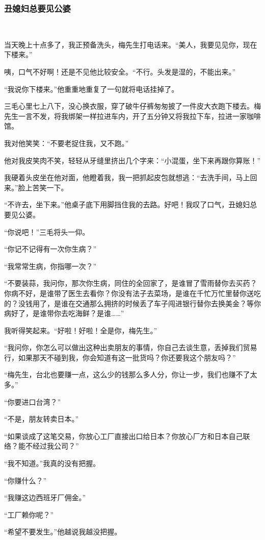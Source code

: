 \subsubsection*{丑媳妇总要见公婆} 
\par 当天晚上十点多了，我正预备洗头，梅先生打电话来。“美人，我要见见你，现在下楼来。”
\par 咦，口气不好啊！还是不见他比较安全。“不行。头发是湿的，不能出来。”
\par “我说你下楼来。”他重重地重复了一句就将电话挂掉了。
\par 三毛心里七上八下，没心换衣服，穿了破牛仔裤匆匆披了一件皮大衣跑下楼去。梅先生一言不发，将我绑架一样拉进车内，开了五分钟又将我拉下车，拉进一家咖啡馆。
\par 我对他笑笑：“不要老捉住我，又不跑。”
\par 他对我皮笑肉不笑，轻轻从牙缝里挤出几个字来：“小混蛋，坐下来再跟你算账！”
\par 我硬着头皮坐在他对面，他瞪着我，我一把抓起皮包就想逃：“去洗手间，马上回来。”脸上苦笑一下。
\par “不许去，坐下来。”他桌子底下用脚挡住我的去路。好吧！我叹了口气，丑媳妇总要见公婆。
\par “你说吧！”三毛将头一仰。
\par “你记不记得有一次你生病？”
\par “我常常生病，你指哪一次？”
\par “不要装蒜，我问你，那次你生病，同住的全回家了，是谁冒了雪雨替你去买药？你病不好，是谁带了医生去看你？你没有法子去菜场，是谁在千忙万忙里替你送吃的？没钱用了，是谁在交通那么拥挤的时候丢了车子闯进银行替你去换美金？等你病好了，是谁带你去吃海鲜？是谁……”
\par 我听得笑起来。“好啦！好啦！全是你，梅先生。”
\par “我问你，你怎么可以做出这种出卖朋友的事情，你自己去谈生意，丢掉我们贸易行，如果那天不碰到我，你会知道有这一批货吗？你还要我这个朋友吗？”
\par “梅先生，台北也要赚一点，这么少的钱那么多人分，你让一步，我们也赚不了太多。”
\par “你要进口台湾？”
\par “不是，朋友转卖日本。”
\par “如果谈成了这笔交易，你放心工厂直接出口给日本？你放心厂方和日本自己联络？能不经过我公司？”
\par “我不知道。”我真的没有把握。
\par “你赚什么？”
\par “我赚这边西班牙厂佣金。”
\par “工厂赖你呢？”
\par “希望不要发生。”他越说我越没把握。
